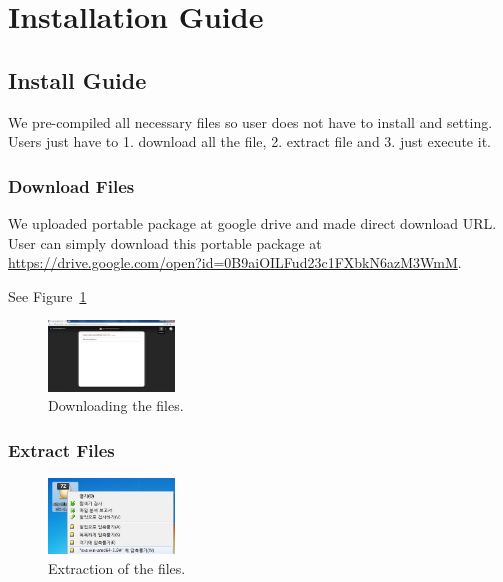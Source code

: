 \documentclass[conference]{IEEEtran}
\begin{document}

\section{Installation Guide}%
\label{sec:installation guide}
\textit{}

\subsection{Install Guide}
  We pre-compiled all necessary files so user does not have to install and setting.
  Users just have to 1. download all the file, 2. extract file and 3. just execute it.

  \subsubsection{Download Files}
    We uploaded portable package at google drive and made direct download URL. User can simply download this portable package at 
    \url{https://drive.google.com/open?id=0B9aiOILFud23c1FXbkN6azM3WmM}.

    See Figure~\ref{fig_download}
      \begin{figure}[ht]
      \centering
      \includegraphics[width=0.3\textwidth]{./figures/downloadURL.jpg}
      \caption{Downloading the files.}
      \label{fig_download}
      \end{figure}

  \subsubsection{Extract Files}
    \begin{figure}[ht]
    \centering
    \includegraphics[width=0.3\textwidth]{./figures/extraction.jpg}
    \caption{Extraction of the files.}
    \label{fig_extraction}
    \end{figure}
\end{document}
